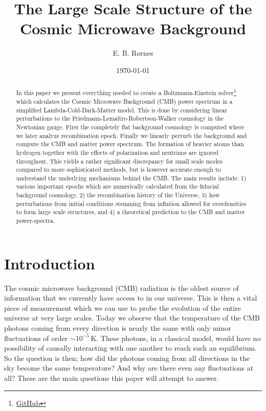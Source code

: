 \documentclass[%
reprint,
 amsmath,amssymb,
 aps,
]{revtex4-2}
\begin{document}
\title{The Large Scale Structure of the Cosmic Microwave Background}

\author{E. B. Rørnes}
\date{\today}

\begin{abstract}
In this paper we present everything needed to create a Boltzmann-Einstein solver\footnote{\href{https://github.com/EdvardRornes/AST5220Project}{GitHub}} which calculates the Cosmic Microwave Background (CMB) power spectrum in a simplified Lambda-Cold-Dark-Matter model. This is done by considering linear perturbations to the Friedmann-Lema\^itre-Robertson-Walker cosmology in the Newtonian gauge. First the completely flat background cosmology is computed where we later analyze recombination epoch. Finally we linearly perturb the background and compute the CMB and matter power spectrum. The formation of heavier atoms than hydrogen together with the effects of polarization and neutrinos are ignored throughout. This yields a rather significant discrepancy for small scale modes compared to more sophisticated methods, but is however accurate enough to understand the underlying mechanisms behind the CMB. The main results include: 1) various important epochs which are numerically calculated from the fiducial background cosmology, 2) the recombination history of the Universe, 3) how perturbations from initial conditions stemming from inflation allowed for overdensities to form large scale structures, and 4) a theoretical prediction to the CMB and matter power-spectra.
\end{abstract}

\maketitle
\tableofcontents
\newpage
\section*{Introduction}
The cosmic microwave background (CMB) radiation is the oldest source of information that we currently have access to in our universe. This is then a vital piece of measurement which we can use to probe the evolution of the entire universe at very large scales. Today we observe that the temperature of the CMB photons coming from every direction is nearly the same with only minor fluctuations of order $\sim10^{-5}\,$K. These photons, in a classical model, would have no possibility of causally interacting with one another to reach such an equilibrium. So the question is then; how did the photons coming from all directions in the sky become the same temperature? And why are there even any fluctuations at all? These are the main questions this paper will attempt to answer.
\end{document}
